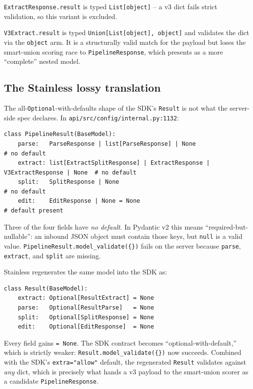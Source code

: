 \documentclass[11pt]{article}
\begin{document}
\texttt{ExtractResponse.result} is typed \texttt{List[object]} -- a v3 dict fails strict validation, so this variant is excluded.

\texttt{V3Extract.result} is typed \texttt{Union[List[object], object]} and validates the dict via the \texttt{object} arm. It is a structurally valid match for the payload but loses the smart-union scoring race to \texttt{PipelineResponse}, which presents as a more ``complete'' nested model.

\subsection{The Stainless lossy translation}

The all-\texttt{Optional}-with-defaults shape of the SDK's \texttt{Result} is not what the server-side spec declares. In \texttt{api/src/config/internal.py:1132}:

\begin{lstlisting}[style=py]
class PipelineResult(BaseModel):
    parse:   ParseResponse | list[ParseResponse] | None                       # no default
    extract: list[ExtractSplitResponse] | ExtractResponse | V3ExtractResponse | None  # no default
    split:   SplitResponse | None                                             # no default
    edit:    EditResponse | None = None                                       # default present
\end{lstlisting}

Three of the four fields have \emph{no default}. In Pydantic v2 this means ``required-but-nullable'': an inbound JSON object must contain those keys, but \texttt{null} is a valid value. \texttt{PipelineResult.model\_validate(\{\})} fails on the server because \texttt{parse}, \texttt{extract}, and \texttt{split} are missing.

Stainless regenerates the same model into the SDK as:

\begin{lstlisting}[style=py]
class Result(BaseModel):
    extract: Optional[ResultExtract] = None
    parse:   Optional[ResultParse]   = None
    split:   Optional[SplitResponse] = None
    edit:    Optional[EditResponse]  = None
\end{lstlisting}

Every field gains \texttt{= None}. The SDK contract becomes ``optional-with-default,'' which is strictly weaker: \texttt{Result.model\_validate(\{\})} now succeeds. Combined with the SDK's \texttt{extra="allow"} default, the regenerated \texttt{Result} validates against \emph{any} dict, which is precisely what hands a v3 payload to the smart-union scorer as a candidate \texttt{PipelineResponse}.
\end{document}
